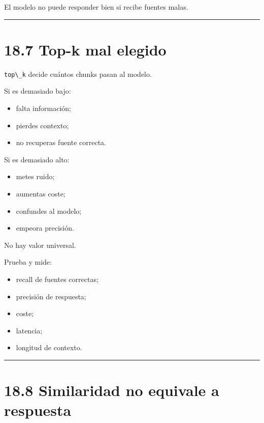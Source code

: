 El modelo no puede responder bien si recibe fuentes malas.

\begin{center}\rule{0.5\linewidth}{0.5pt}\end{center}

\section{18.7 Top-k mal elegido}\label{top-k-mal-elegido}

\passthrough{\lstinline!top\_k!} decide cuántos chunks pasan al modelo.

Si es demasiado bajo:

\begin{itemize}
\tightlist
\item
  falta información;
\item
  pierdes contexto;
\item
  no recuperas fuente correcta.
\end{itemize}

Si es demasiado alto:

\begin{itemize}
\tightlist
\item
  metes ruido;
\item
  aumentas coste;
\item
  confundes al modelo;
\item
  empeora precisión.
\end{itemize}

No hay valor universal.

Prueba y mide:

\begin{itemize}
\tightlist
\item
  recall de fuentes correctas;
\item
  precisión de respuesta;
\item
  coste;
\item
  latencia;
\item
  longitud de contexto.
\end{itemize}

\begin{center}\rule{0.5\linewidth}{0.5pt}\end{center}

\section{18.8 Similaridad no equivale a
respuesta}\label{similaridad-no-equivale-a-respuesta}

